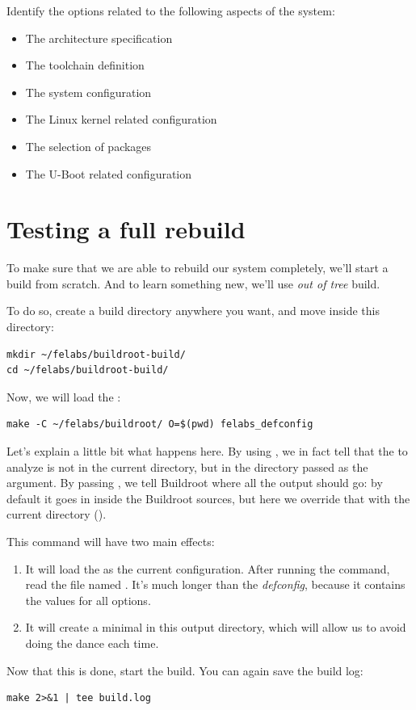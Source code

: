 Identify the options related to the following aspects of the system:

\begin{itemize}
\item The architecture specification
\item The toolchain definition
\item The system configuration
\item The Linux kernel related configuration
\item The selection of packages
\item The U-Boot related configuration
\end{itemize}

\section{Testing a full rebuild}

To make sure that we are able to rebuild our system completely, we'll
start a build from scratch. And to learn something new, we'll use {\em
  out of tree} build.

To do so, create a build directory anywhere you want, and move inside
this directory:

\begin{verbatim}
mkdir ~/felabs/buildroot-build/
cd ~/felabs/buildroot-build/
\end{verbatim}

Now, we will load the :

\begin{verbatim}
make -C ~/felabs/buildroot/ O=$(pwd) felabs_defconfig
\end{verbatim}

Let's explain a little bit what happens here. By using
, we in fact tell  that the
 to analyze is not in the current directory, but in the
directory passed as the  argument. By passing , we
tell Buildroot where all the output should go: by default it goes in
 inside the Buildroot sources, but here we override that
with the current directory ().

This command will have two main effects:

\begin{enumerate}

\item It will load the  as the current
  configuration. After running the command, read the file named
  . It's much longer than the {\em defconfig}, because
  it contains the values for all options.

\item It will create a minimal  in this output
  directory, which will allow us to avoid doing the  dance each time.

\end{enumerate}

Now that this is done, start the build. You can again save the build
log:

\begin{verbatim}
make 2>&1 | tee build.log
\end{verbatim}

